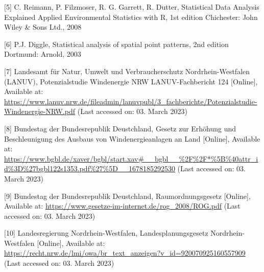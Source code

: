 \documentclass[
]{article}
\begin{document}
{[}5{]} C. Reimann, P. Filzmoser, R. G. Garrett, R. Dutter, Statistical
Data Analysis Explained Applied Environmental Statistics with R, 1st
edition Chichester: John Wiley \& Sons Ltd., 2008

{[}6{]} P.J. Diggle, Statistical analysis of spatial point patterns, 2nd
edition Dortmund: Arnold, 2003

{[}7{]} Landesamt für Natur, Umwelt und Verbraucherschutz
Nordrhein-Westfalen (LANUV), Potenzialstudie Windenergie NRW
LANUV-Fachbericht 124 {[}Online{]}, Available at:
\url{https://www.lanuv.nrw.de/fileadmin/lanuvpubl/3_fachberichte/Potenzialstudie-Windenergie-NRW.pdf}
(Last accessed on: 03. March 2023)

{[}8{]} Bundestag der Bundesrepublik Deustchland, Gesetz zur Erhöhung
und Beschleunigung des Ausbaus von Windenergieanlagen an Land
{[}Online{]}, Available at:
\url{https://www.bgbl.de/xaver/bgbl/start.xav\#__bgbl__\%2F\%2F*\%5B\%40attr_id\%3D\%27bgbl122s1353.pdf\%27\%5D__1678185292530}
(Last accessed on: 03. March 2023)

{[}9{]} Bundestag der Bundesrepublik Deustchland, Raumordnungsgesetz
{[}Online{]}, Available at:
\url{https://www.gesetze-im-internet.de/rog_2008/ROG.pdf} (Last accessed
on: 03. March 2023)

{[}10{]} Landesregierung Nordrhein-Westfalen, Landesplanungsgesetz
Nordrhein-Westfalen {[}Online{]}, Available at:
\url{https://recht.nrw.de/lmi/owa/br_text_anzeigen?v_id=920070925160557909}
(Last accessed on: 03. March 2023)
\end{document}

